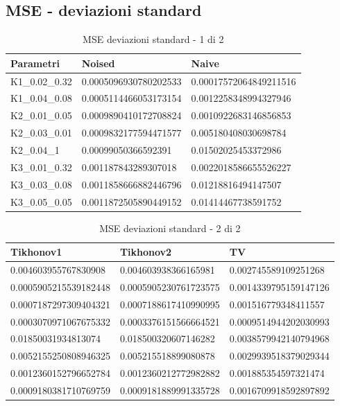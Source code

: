 \documentclass[12pt]{article}
\begin{document}
    \subsection{MSE - deviazioni standard}
    \begin{table}[!ht]
    \centering
    \begin{tabular}{|l|l|l|}
    \hline
        Parametri & Noised & Naive \\ \hline
        K1\_0.02\_0.32 & 0.0005096930780202533 & 0.00017572064849211516 \\ \hline
        K1\_0.04\_0.08 & 0.0005114466053173154 & 0.0012258348994327946 \\ \hline
        K2\_0.01\_0.05 & 0.0009890410172708824 & 0.0010922683146856853 \\ \hline
        K2\_0.03\_0.01 & 0.0009832177594471577 & 0.005180408030698784 \\ \hline
        K2\_0.04\_1 & 0.00099050366592391 & 0.01502025453372986 \\ \hline
        K3\_0.01\_0.32 & 0.001187843289307018 & 0.0022018586655526227 \\ \hline
        K3\_0.03\_0.08 & 0.0011858666882446796 & 0.01218816494147507 \\ \hline
        K3\_0.05\_0.05 & 0.0011872505890449152 & 0.01414467738591752 \\ \hline
    \end{tabular}
    \caption{MSE deviazioni standard - 1 di 2}
    \label{table:12}
    \end{table}
    
    \begin{table}[!ht]
    \centering
    \begin{tabular}{|l|l|l|}
    \hline
        Tikhonov1 & Tikhonov2 & TV \\ \hline
        0.004603955767830908 & 0.004603938366165981 & 0.002745589109251268 \\ \hline
        0.0005905215539182448 & 0.0005905230761723575 & 0.0014339795159147126 \\ \hline
        0.0007187297309404321 & 0.0007188617410990995 & 0.001516779348411557 \\ \hline
        0.0003070971067675332 & 0.0003376151566664521 & 0.0009514944202030993 \\ \hline
        0.01850031934813074 & 0.018500320607146282 & 0.0038579942140794968 \\ \hline
        0.0052155250808946325 & 0.005215518899080878 & 0.0029939518379029344 \\ \hline
        0.0012360152796652784 & 0.0012360212772982882 & 0.001885354597321474 \\ \hline
        0.0009180381710769759 & 0.0009181889991335728 & 0.0016709918592897892 \\ \hline
    \end{tabular}
    \caption{MSE deviazioni standard - 2 di 2}
    \label{table:13}
    \end{table}
    
    \newpage

\section{}
    
    
\end{document}
